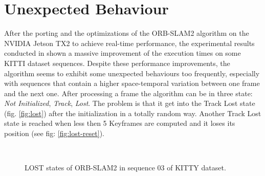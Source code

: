 

\section{Unexpected Behaviour}
After the porting and the optimizations of the ORB-SLAM2 algorithm on the NVIDIA Jetson TX2 to achieve real-time performance, the experimental results conducted in \cite{iros2019} shown a massive improvement of the execution times on some KITTI dataset sequences.
Despite these performance improvements, the algorithm seems to exhibit some unexpected behaviours too frequently, especially with sequences that contain a higher space-temporal variation between one frame and the next one. After processing a frame the algorithm can be in three state: \textit{Not Initialized}, \textit{Track}, \textit{Lost}. The problem is that it get into the Track Lost state (fig. \ref{fig:lost}) after the initialization in a totally random way. Another Track Lost state is reached when less then 5 Keyframes are computed and it loses its position (see fig: \ref{fig:lost-reset}).

\begin{figure}[t]
	\centering
	\\
	\caption{LOST states of ORB-SLAM2 in sequence 03 of KITTY dataset.}
\end{figure}

